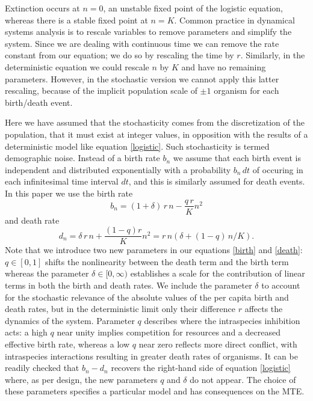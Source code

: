 \documentclass[a4paper,10pt]{article}
\numberwithin{equation}{section} %
\begin{document}
Extinction occurs at $n=0$, an unstable fixed point of the logistic equation, whereas there is a stable fixed point at $n=K$. 
Common practice in dynamical systems analysis is to rescale variables to remove parameters and simplify the system. 
Since we are dealing with continuous time we can remove the rate constant from our equation; we do so by rescaling the time by $r$. 
Similarly, in the deterministic equation we could rescale $n$ by $K$ and have no remaining parameters.
However, in the stochastic version we cannot apply this latter rescaling, because of the implicit population scale of $\pm1$ organism for each birth/death event. %

Here we have assumed that the stochasticity comes from the discretization of the population, that it must exist at integer values, in opposition with the results of a deterministic model like equation \ref{logistic}. 
Such stochasticity is termed demographic noise. 
Instead of a birth rate $b_n$ we assume that each birth event is independent and distributed exponentially with a probability $b_n\,dt$ of occuring in each infinitesimal time interval $dt$, and this is similarly assumed for death events. %
In this paper we use the birth rate
\begin{equation}
b_n = (1 + \delta)\,r\,n - \frac{q\,r}{K}n^2%
\label{birth}
\end{equation}
and death rate
\begin{equation}
d_n = \delta\,r\,n + \frac{(1-q)r}{K} n^2 = r\,n\left(\delta+(1-q)\,n/K\right).
\label{death}
\end{equation}
Note that we introduce two new parameters in our equations \ref{birth} and \ref{death}: $q\in[0,1]$ shifts the nonlinearity between the death term and the birth term whereas the parameter $\delta\in[0,\infty)$ establishes a scale for the contribution of linear terms in both the birth and death rates.
We include the parameter $\delta$ to account for the stochastic relevance of the absolute values of the per capita birth and death rates, but in the deterministic limit only their difference $r$ affects the dynamics of the system. 
Parameter $q$ describes where the intraspecies inhibition acts: a high $q$ near unity implies competition for resources and a decreased effective birth rate, whereas a low $q$ near zero reflects more direct conflict, with intraspecies interactions resulting in greater death rates of organisms. 
It can be readily checked that $b_n-d_n$ recovers the right-hand side of equation \ref{logistic} where, as per design, the new parameters $q$ and $\delta$ do not appear.
The choice of these parameters specifies a particular model and has consequences on the MTE. 
\end{document}
